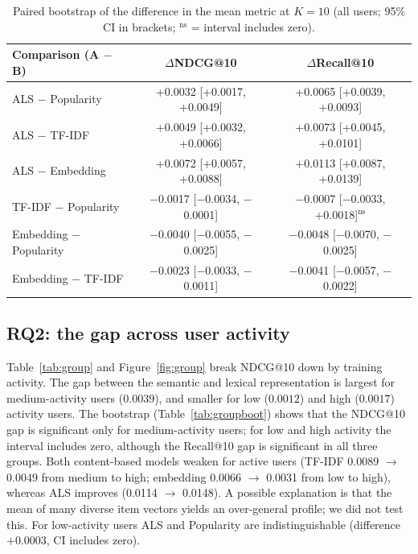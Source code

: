\begin{table}[t]
\caption{Paired bootstrap of the difference in the mean metric at $K=10$ (all users; 95\% CI in brackets; $^{\mathrm{ns}}$ = interval includes zero).}
\label{tab:boot}
\small
\begin{tabular}{lcc}
\toprule
Comparison (A $-$ B) & $\Delta$NDCG@10 & $\Delta$Recall@10 \\
\midrule
ALS $-$ Popularity & +0.0032 [+0.0017, +0.0049] & +0.0065 [+0.0039, +0.0093] \\
ALS $-$ TF-IDF & +0.0049 [+0.0032, +0.0066] & +0.0073 [+0.0045, +0.0101] \\
ALS $-$ Embedding & +0.0072 [+0.0057, +0.0088] & +0.0113 [+0.0087, +0.0139] \\
TF-IDF $-$ Popularity & $-$0.0017 [$-$0.0034, $-$0.0001] & $-$0.0007 [$-$0.0033, +0.0018]$^{\mathrm{ns}}$ \\
Embedding $-$ Popularity & $-$0.0040 [$-$0.0055, $-$0.0025] & $-$0.0048 [$-$0.0070, $-$0.0025] \\
Embedding $-$ TF-IDF & $-$0.0023 [$-$0.0033, $-$0.0011] & $-$0.0041 [$-$0.0057, $-$0.0022] \\
\bottomrule
\end{tabular}
\end{table}

\subsection{RQ2: the gap across user activity}
Table~\ref{tab:group} and Figure~\ref{fig:group} break NDCG@10 down by training activity. The gap
between the semantic and lexical representation is largest for medium-activity users
($0.0039$), and smaller for low ($0.0012$) and high ($0.0017$) activity users. The bootstrap
(Table~\ref{tab:groupboot}) shows that the NDCG@10 gap is significant only for medium-activity
users; for low and high activity the interval includes zero, although the Recall@10 gap is
significant in all three groups. Both content-based models weaken for active users (TF-IDF
0.0089 $\to$ 0.0049 from medium to high; embedding 0.0066 $\to$ 0.0031 from low to high), whereas ALS
improves (0.0114 $\to$ 0.0148). A possible explanation is that the mean of many diverse item
vectors yields an over-general profile; we did not test this. For low-activity users ALS and
Popularity are indistinguishable (difference $+0.0003$, CI includes zero).


